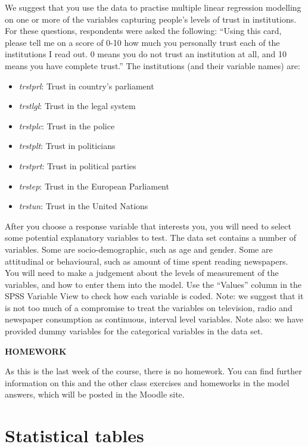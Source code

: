 We suggest that you use the data to practise multiple linear regression modelling on one or more of the variables
capturing people's levels of trust in institutions. For these questions, respondents were asked the
following: ``Using this card, please tell me on a score of 0-10 how much you personally trust each
of the institutions I read out. 0 means you do not trust an institution at all, and 10 means you
have complete trust.''
The institutions (and their variable names) are:
\begin{itemize}
\item
\emph{trstprl}: Trust in country's parliament
\item
\emph{trstlgl}: Trust in the legal system
\item
\emph{trstplc}: Trust in the police
\item
\emph{trstplt}: Trust in politicians
\item
\emph{trstprt}: Trust in political parties
\item
\emph{trstep}: Trust in the European Parliament
\item
\emph{trstun}: Trust in the United Nations
\end{itemize}

After you choose a response variable that interests you, you will need to select some potential
explanatory variables to test. The data set contains a number of variables. Some are socio-demographic,
such as age and gender.
Some are attitudinal or behavioural, such as amount of time spent reading newspapers. You will need to make a
judgement about the levels of measurement of the variables, and how to enter them into the model. Use the ``Values''
column in the SPSS Variable View to check how each variable is coded. Note: we suggest
that it is not too much of a compromise to treat the variables on television, radio and newspaper consumption
as continuous, interval level variables. Note also: we have provided dummy variables for the
categorical variables in the data set.






\textbf{HOMEWORK}

As this is the last week of the course, there is no homework. You can
find further information on this and the other class exercises and
homeworks in the model answers, which will be posted in the Moodle site.

\newpage
\chapter{
Statistical tables}
\label{c_disttables}

